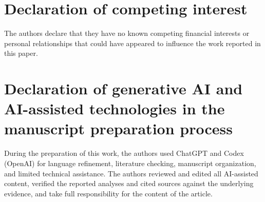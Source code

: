 \documentclass[preprint,12pt]{elsarticle}
\begin{document}
\section*{Declaration of competing interest}
The authors declare that they have no known competing financial interests or personal relationships that could have appeared to influence the work reported in this paper.

\section*{Declaration of generative AI and AI-assisted technologies in the manuscript preparation process}
During the preparation of this work, the authors used ChatGPT and Codex (OpenAI) for language refinement, literature checking, manuscript organization, and limited technical assistance. The authors reviewed and edited all AI-assisted content, verified the reported analyses and cited sources against the underlying evidence, and take full responsibility for the content of the article.



\end{document}
